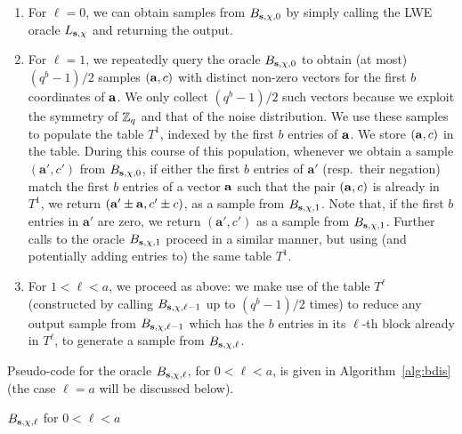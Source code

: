 \begin{enumerate}
\item For $\ell = 0$, we can obtain samples from ${B_{\mathbf{s},\chi,0}}$ by simply calling the LWE oracle $L_{\mathbf{s},\chi}$ and returning the output.
\item For $\ell = 1$, we repeatedly query the oracle ${B_{\mathbf{s},\chi,0}}$ to obtain (at most) $(q^b-1)/2$ samples $(\mathbf{a},c)$ with distinct non-zero vectors for the first $b$ coordinates of $\mathbf{a}$. We only collect $(q^b-1)/2$ such vectors because we exploit the symmetry of $\mathbb{Z}_q$ and that of the noise distribution. We use these samples to populate the table $T^1$, indexed by the first $b$ entries of $\mathbf{a}$. We store $(\mathbf{a}, c)$ in the table. During this course of this population, whenever we obtain a sample $(\mathbf{a'},c')$ from ${B_{\mathbf{s},\chi,0}}$, if either the first $b$ entries of $\mathbf{a}'$ (resp.\ their negation) match the first $b$ entries of a vector $\mathbf{a}$ such that the pair $(\mathbf{a},c)$ is already in $T^1$, we return $(\mathbf{a}'\pm \mathbf{a},c'\pm c)$, as a sample from ${B_{\mathbf{s},\chi,1}}$. Note that, if the first $b$ entries in $\mathbf{a}'$ are zero, we return $(\mathbf{a}',c')$ as a sample from ${B_{\mathbf{s},\chi,1}}$. Further calls to the oracle ${B_{\mathbf{s},\chi,1}}$ proceed in a similar manner, but using (and potentially adding entries to) the same table $T^1$. 

\item For $1 < \ell < a$, we proceed as above:  we make use of the table $T^{\ell}$ (constructed by calling ${B_{\mathbf{s},\chi,\ell - 1}}$ up to $(q^b-1)/2$ times) to reduce any output sample from ${B_{\mathbf{s},\chi,\ell - 1}}$ which has the $b$ entries in its $\ell$-th block already in  $T^{\ell}$, to generate a sample from  ${B_{\mathbf{s},\chi,\ell}}$.
\end{enumerate}

Pseudo-code for the oracle ${B_{\mathbf{s},\chi,\ell}}$, for $0 < \ell < a$, is given in Algorithm~\ref{alg:bdis} (the case $\ell = a$ will be discussed below). 

\begin{algorithm}[H]
\label{alg:bdis}
\caption{${B_{\mathbf{s},\chi,\ell}}$ for $0 < \ell < a$}
\end{algorithm}


